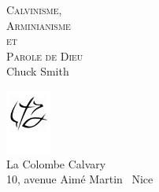
\newcommand{\HRule}{\rule{\linewidth}{0.2mm}}

\begin{titlepage}
\begin{center}
\mbox{}
\vfill
\textsc{ \Huge Calvinisme,\\[0.4cm] Arminianisme\\[0.4cm] et\\[0.4cm] Parole de Dieu}\\[1.5cm]

{\LARGE Chuck Smith}\\[1cm]
\vfill

\includegraphics[width=4em]{revival_potrace} \\[-5mm]
\logofont\large La Colombe Calvary \\
\normalfont\normalsize 10, avenue Aimé Martin ~Nice\\

\end{center}
\end{titlepage}


